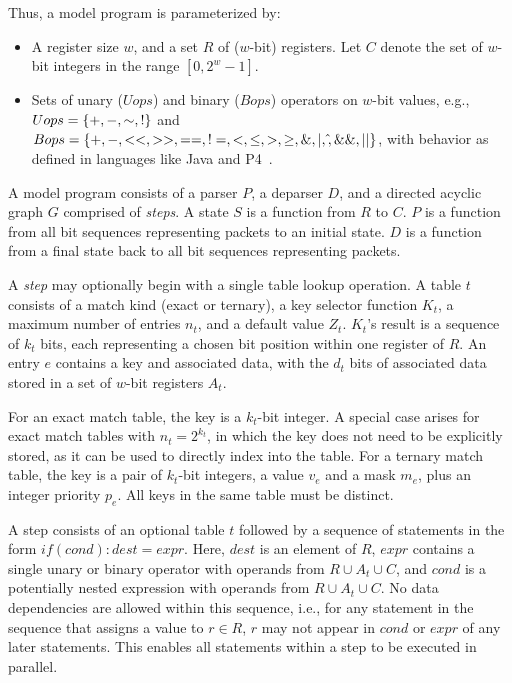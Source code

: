 Thus, a \cram model program is parameterized by:

\begin{itemize}
  \item A register size $w$, and a set $R$ of ($w$-bit) registers. Let $C$ denote the set of $w$-bit integers in the range $[0, 2^w-1]$.
  \item Sets of unary ($Uops$) and binary ($Bops$) operators on $w$-bit values, e.g., $Uops = \{ +, -, \mathord{\sim}, ! \}$ and $Bops = \{ +, -, <<, >>, ==, \mathrel{\mathtt{!=}}, <, \leq, >, \geq, \mathbin{\&}, \mathbin{|}, \mathbin{\hat{}}, \&\&, || \}$, with behavior as defined in languages like Java and P4~\cite{p4_ecosystem}.
\end{itemize}

A \cram model program consists of a parser $P$, a deparser $D$, and a directed acyclic graph $G$ comprised of {\em steps}. A state $S$ is a function from $R$ to $C$. $P$ is a function from all bit sequences representing packets to an initial state. $D$ is a function from a final state back to all bit sequences representing packets.

A {\em step} may optionally begin with a single table lookup operation. A table $t$ consists of a match kind (exact or ternary), a key selector function $K_t$, a maximum number of entries $n_t$, and a default value $Z_t$. $K_t$'s result is a sequence of $k_t$ bits, each representing a chosen bit position within one register of $R$. An entry $e$ contains a key and associated data, with the $d_t$ bits of associated data stored in a set of $w$-bit registers $A_t$.

For an exact match table, the key is a $k_t$-bit integer. A special case arises for exact match tables with $n_t = 2^{k_t}$, in which the key does not need to be explicitly stored, as it can be used to directly index into the table. For a ternary match table, the key is a pair of $k_t$-bit integers, a value $v_e$ and a mask $m_e$, plus an integer priority $p_e$. All keys in the same table must be distinct.

A step consists of an optional table $t$ followed by a sequence of statements in the form $if (cond): dest = expr$. Here, $dest$ is an element of $R$, $expr$ contains a single unary or binary operator with operands from $R \cup A_t \cup C$, and $cond$ is a potentially nested expression with operands from $R \cup A_t \cup C$. No data dependencies are allowed within this sequence, i.e., for any statement in the sequence that assigns a value to $r \in R$, $r$ may not appear in $cond$ or $expr$ of any later statements. This enables all statements within a step to be executed in parallel.

